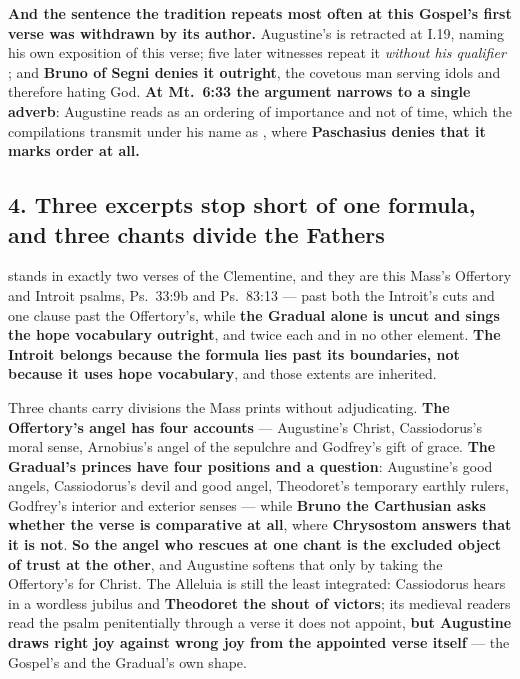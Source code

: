 \textbf{And the sentence the tradition repeats most often at this Gospel's first
verse was withdrawn by its author.} Augustine's  is retracted at  I.19,
naming his own exposition of this verse; five later witnesses repeat it \emph{without his qualifier} ; and
\textbf{Bruno of Segni denies it outright}, the covetous man serving idols and
therefore hating God.
\textbf{At Mt.\ 6:33 the argument narrows to a single adverb}: Augustine reads
 as an ordering of importance and not of time, which the
compilations transmit under his name as ,
where \textbf{Paschasius denies that it marks order at all.}

\subsection*{4. Three excerpts stop short of one formula, and three chants divide the Fathers}

 stands in exactly two verses of the Clementine,
and they are this Mass's Offertory and Introit psalms, Ps.\ 33:9b and
Ps.\ 83:13 --- past both the Introit's cuts and one clause past the
Offertory's, while
\textbf{the Gradual alone is uncut and sings the hope vocabulary outright},
 and  twice each and in no other element.
\textbf{The Introit belongs because the formula lies past its boundaries, not
because it uses hope vocabulary}, and those extents are inherited.

Three chants carry divisions the Mass prints without adjudicating. \textbf{The
Offertory's angel has four accounts} --- Augustine's Christ, Cassiodorus's moral
sense, Arnobius's angel of the sepulchre and Godfrey's gift of grace.
\textbf{The Gradual's princes have four positions and a question}: Augustine's
good angels, Cassiodorus's devil and good angel, Theodoret's temporary earthly
rulers, Godfrey's interior and exterior senses --- while \textbf{Bruno the
Carthusian asks whether the verse is comparative at all}, where
\textbf{Chrysostom answers that it is not}. \textbf{So the angel who rescues at one chant is the excluded
object of trust at the other}, and Augustine softens that only by taking the
Offertory's  for Christ. The Alleluia is still the least
integrated: Cassiodorus hears in  a wordless jubilus and
\textbf{Theodoret the shout of victors}; its medieval readers read the psalm
penitentially through a verse it does not appoint, \textbf{but Augustine
draws right joy against wrong joy from the appointed verse itself} --- the
Gospel's and the Gradual's own shape.

